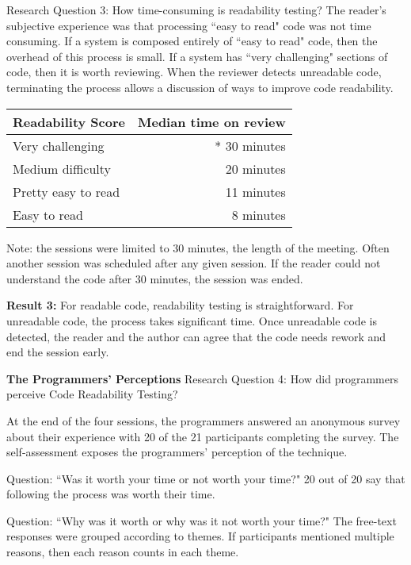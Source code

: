 \documentclass[conference]{IEEEtran}
\begin{document}
Research Question 3: How time-consuming is readability testing?
The reader’s subjective experience was that processing ``easy to read" code was not time consuming. If a system is composed entirely of ``easy to read" code, then the overhead of this process is small. If a system has ``very challenging" sections of code, then it is worth reviewing. When the reviewer detects unreadable code, terminating the process allows a discussion of ways to improve code readability.

\begin{table}[!t]
\renewcommand{\arraystretch}{1.3}
\centering
\begin{tabular}{l||r}
\hline
\bfseries Readability Score & \bfseries Median time on review\\
\hline\hline
Very challenging    & * 30 minutes \\
Medium difficulty   & 20 minutes   \\
Pretty easy to read & 11 minutes   \\
Easy to read        & 8 minutes  
\end{tabular}
\end{table}

Note: the sessions were limited to 30 minutes, the length of the meeting. Often another session was scheduled after any given session. If the reader could not understand the code after 30 minutes, the session was ended.

\textbf{Result 3:} For readable code, readability testing is straightforward. For unreadable code, the process takes significant time. Once unreadable code is detected, the reader and the author can agree that the code needs rework and end the session early.

\textbf{The Programmers’ Perceptions}
Research Question 4: How did programmers perceive Code Readability Testing?

At the end of the four sessions, the programmers answered an anonymous survey about their experience with 20 of the 21 participants completing the survey. The self-assessment exposes the programmers’ perception of the technique.

Question: ``Was it worth your time or not worth your time?" 20 out of 20 say that following the process was worth their time.

Question: ``Why was it worth or why was it not worth your time?" The free-text responses were grouped according to themes. If participants mentioned multiple reasons, then each reason counts in each theme.
\end{document}
